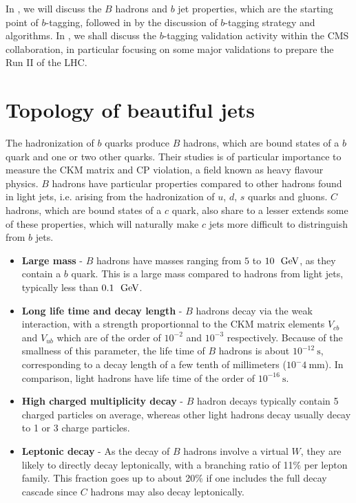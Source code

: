     In , we will discuss the $B$ hadrons and $b$ jet properties,
    which are the starting point of $b$-tagging, followed in 
    by the discussion of $b$-tagging strategy and algorithms. In ,
    we shall discuss the $b$-tagging validation activity within the CMS collaboration, in
    particular focusing on some major validations to prepare the Run II of the LHC.

    \section{Topology of beautiful jets \label{sec:bJetProperties}}

    The hadronization of $b$ quarks produce $B$ hadrons, which are bound states of
    a $b$ quark and one or two other quarks. Their studies is of particular importance
    to measure the CKM matrix and CP violation, a field known as heavy flavour physics.
    $B$ hadrons have particular properties compared to other hadrons found in light jets,
    i.e. arising from the hadronization of $u$, $d$, $s$ quarks and gluons. $C$ hadrons,
    which are bound states of a $c$ quark, also share to a lesser extends some of these
    properties, which will naturally make $c$ jets more difficult to distringuish from
    $b$ jets.
    \begin{itemize}
        \item \textbf{Large mass} - $B$ hadrons have masses ranging from $5$ to $10~~\text{GeV}$, as
              they contain a $b$ quark. This is a large mass compared to hadrons from
              light jets, typically less than $0.1~~\text{GeV}$.
        \item \textbf{Long life time and decay length} - $B$ hadrons decay via the weak
              interaction, with a strength proportionnal to the CKM matrix elements $V_{cb}$ and $V_{ub}$
              which are of the order of $10^{-2}$ and $10^{-3}$ respectively. Because of
              the smallness of this parameter, the life time of $B$ hadrons is about
              $10^{-12}~\text{s}$, corresponding to a decay length of a few tenth of millimeters
              ($10^-4~\text{mm}$). In comparison, light hadrons have life time of the order
              of $10^{-16}~\text{s}$.
        \item \textbf{High charged multiplicity decay} - $B$ hadron decays typically
              contain 5 charged particles on average, whereas other light hadrons decay
              usually decay to 1 or 3 charge particles.
        \item \textbf{Leptonic decay} - As the decay of $B$ hadrons involve a virtual $W$,
              they are likely to directly decay leptonically, with a branching ratio of
              11\% per lepton family. This fraction goes up to about 20\% if one
              includes the full decay cascade since $C$ hadrons may also decay leptonically.
    \end{itemize}

